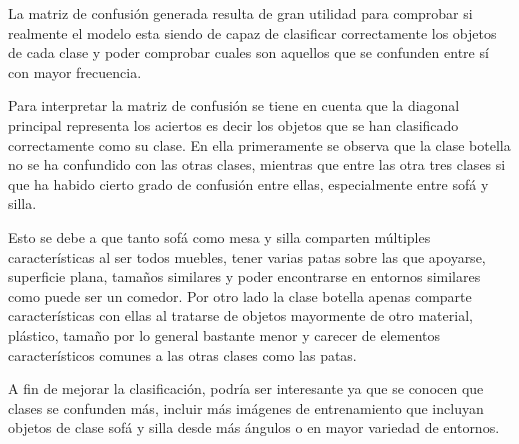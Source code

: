     La matriz de confusión generada resulta de gran utilidad para comprobar si realmente el modelo esta siendo de capaz de clasificar correctamente los objetos de cada clase y poder comprobar cuales son aquellos que se confunden entre sí con mayor frecuencia.
    
    Para interpretar la matriz de confusión se tiene en cuenta que la diagonal principal representa los aciertos es decir los objetos que se han clasificado correctamente como su clase. En ella primeramente se observa que la clase botella no se ha confundido con las otras clases, mientras que entre las otra tres clases si que ha habido cierto grado de confusión entre ellas, especialmente entre sofá y silla.
    
    Esto se debe a que tanto sofá como mesa y silla comparten múltiples características al ser todos muebles, tener varias patas sobre las que apoyarse, superficie plana, tamaños similares y poder encontrarse en entornos similares como puede ser un comedor. Por otro lado la clase botella apenas comparte características con ellas al tratarse de objetos mayormente de otro material, plástico, tamaño por lo general bastante menor y carecer de elementos característicos comunes a las otras clases como las patas.
    
    A fin de mejorar la clasificación, podría ser interesante ya que se conocen que clases se confunden más, incluir más imágenes de entrenamiento que incluyan objetos de clase sofá y silla desde más ángulos o en mayor variedad de entornos.
